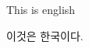 \documentclass{article}
\newcommand{\textko}[1]{\begin{CJK}{UTF8}{mj}#1\end{CJK}}
\begin{document}
This is english

\textko{이것은 한국이다.}
\end{document}
